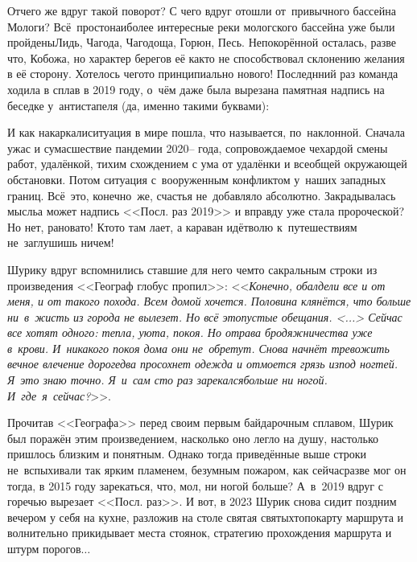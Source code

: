 {{Отчего же вдруг такой поворот? С чего вдруг отошли от~привычного бассейна Мологи\cite{СоболевВепсскаяЛетопись}? Всё~просто\mdash наиболее интересные реки мологского бассейна уже были пройдены\mdash Лидь, Чагода, Чагодоща, Горюн, Песь. Непокорённой осталась, разве что, Кобожа, но характер берегов её как\sdash то не способствовал склонению желания в её сторону. Хотелось чего\sdash то принципиально нового! Последнний раз команда ходила в сплав в 2019 году, о~чём даже была вырезана памятная надпись на беседке у~антистапеля (да, именно такими буквами): 

{\centering\LARGE{}}

\newpage
И как накаркали\mdash ситуация в мире пошла, что называется, по~наклонной. Сначала ужас и сумасшествие пандемии 2020\thinspace\nobreakdash-- года, сопровождаемое чехардой смены работ, удалёнкой, тихим схождением с ума от удалёнки и всеобщей окружающей обстановки. Потом ситуация с~вооруженным конфликтом у~наших западных границ. Всё~это, конечно~же, счастья не~добавляло абсолютно. Закрадывалась мысль\mdash а может надпись <<Посл. раз 2019>> и вправду уже стала пророческой? Но нет, рановато! Кто\sdash то там лает, а караван идёт\mdash волю к~путешествиям не~заглушишь ничем!

Шурику вдруг вспомнились ставшие для него чем\sdash то сакральным строки из произведения <<Географ глобус пропил>>: <<\textit{Конечно, обалдели все и от меня, и от такого похода. Всем домой хочется. Половина клянётся, что больше ни~в~жисть из города не вылезет. Но всё это\mdash пустые обещания. <...> Сейчас все хотят одного: тепла, уюта, покоя. Но отрава бродяжничества уже в~крови. И~никакого покоя дома они не~обретут. Снова начнёт тревожить вечное влечение дорог\mdash едва просохнет одежда и отмоется грязь из\sdash под ногтей. Я~это знаю точно. Я~и~сам сто раз зарекался\mdash больше ни ногой. И~где~я~сейчас?}>>\cite{ГеографГлобусПропил}.

Прочитав <<Географа>> перед своим первым байдарочным сплавом, Шурик был поражён этим произведением, насколько оно легло на душу, настолько пришлось близким и понятным. Однако тогда приведённые выше строки не~вспыхивали так ярким пламенем, безумным пожаром, как сейчас\mdash разве мог он тогда, в 2015 году зарекаться, что, мол, ни ногой больше? А~в~2019 вдруг с горечью вырезает <<Посл. раз>>. И вот, в 2023 Шурик снова сидит поздним вечером у себя на кухне, разложив на столе святая святых\mdash топокарту маршрута и волнительно прикидывает места стоянок, стратегию прохождения маршрута и штурм порогов$\ldots$ 

}}

